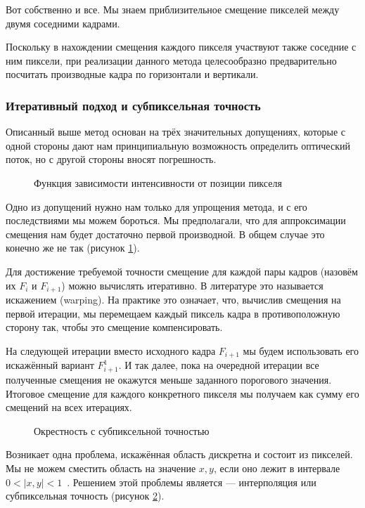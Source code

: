 Вот собственно и все. Мы знаем приблизительное смещение пикселей между двумя соседними кадрами.

Поскольку в нахождении смещения каждого пикселя участвуют также соседние с ним пиксели, при реализации данного метода целесообразно предварительно посчитать производные кадра по горизонтали и вертикали.
\subsubsection{Итеративный подход и субпиксельная точность} %

Описанный выше метод основан на трёх значительных допущениях, которые с одной стороны дают нам принципиальную возможность определить оптический поток, но с другой стороны вносят погрешность. 
\begin{figure}[ht]
\caption{Функция зависимости интенсивности от позиции пикселя}
\label{pic:math_3}
\end{figure}

Одно из допущений нужно нам только для упрощения метода, и с его последствиями мы можем бороться. Мы предполагали, что для аппроксимации смещения нам будет достаточно первой производной. В общем случае это конечно же не так (рисунок \ref{pic:math_3}). 

Для достижение требуемой точности смещение для каждой пары кадров (назовём их $F_i$ и $F_{i+1}$) можно вычислять итеративно. В литературе это называется искажением (warping). На практике это означает, что, вычислив смещения на первой итерации, мы перемещаем каждый пиксель кадра в противоположную сторону так, чтобы это смещение компенсировать.

На следующей итерации вместо исходного кадра $F_{i+1}$ мы будем использовать его искажённый вариант $F_{i+1}^1$. И так далее, пока на очередной итерации все полученные смещения не окажутся меньше заданного порогового значения. Итоговое смещение для каждого конкретного пикселя мы получаем как сумму его смещений на всех итерациях. 
\begin{figure}[ht]
\caption{Окрестность с субпиксельной точностью}
\label{pic:grid}
\end{figure}

Возникает одна проблема, искажённая область дискретна и состоит из пикселей. Мы не можем сместить область на значение $x,y$, если оно лежит в интервале $0< |x,y| < 1$~\cite{sub_toch}. Решением этой проблемы является — интерполяция или субпиксельная точность (рисунок \ref{pic:grid}).

